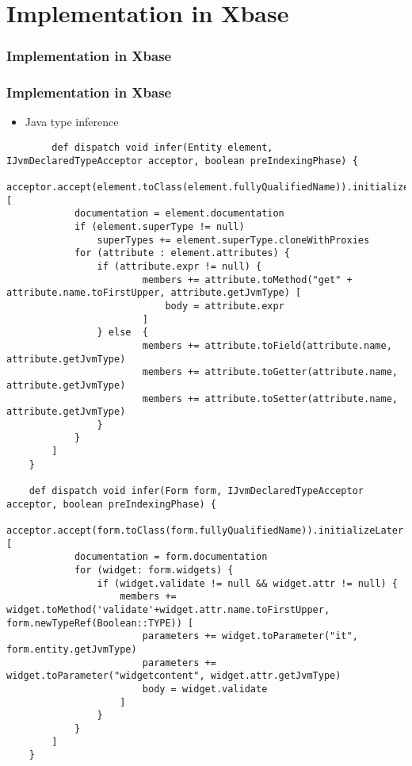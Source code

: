 \section{Implementation in Xbase}

\begin{frame}
\frametitle{Implementation in Xbase}
\tableofcontents[currentsection]
\end{frame}

\begin{frame}
\frametitle{Implementation in Xbase}
 
 \begin{itemize}
   \item Java type inference
 \end{itemize}
 
 \begin{verbatim}
    	def dispatch void infer(Entity element, IJvmDeclaredTypeAcceptor acceptor, boolean preIndexingPhase) {
   		acceptor.accept(element.toClass(element.fullyQualifiedName)).initializeLater [
			documentation = element.documentation
			if (element.superType != null)
				superTypes += element.superType.cloneWithProxies
		    for (attribute : element.attributes) {
		    	if (attribute.expr != null) {
						members += attribute.toMethod("get" + attribute.name.toFirstUpper, attribute.getJvmType) [
			        		body = attribute.expr
		        		]
		        } else  {
		            	members += attribute.toField(attribute.name, attribute.getJvmType)
			            members += attribute.toGetter(attribute.name, attribute.getJvmType)
			            members += attribute.toSetter(attribute.name, attribute.getJvmType)
		        }
		    }
   		]
   	}

 	def dispatch void infer(Form form, IJvmDeclaredTypeAcceptor acceptor, boolean preIndexingPhase) {
   		acceptor.accept(form.toClass(form.fullyQualifiedName)).initializeLater [
			documentation = form.documentation
		    for (widget: form.widgets) {
		    	if (widget.validate != null && widget.attr != null) {
		    		members += widget.toMethod('validate'+widget.attr.name.toFirstUpper, form.newTypeRef(Boolean::TYPE)) [
		    			parameters += widget.toParameter("it", form.entity.getJvmType)
		    			parameters += widget.toParameter("widgetcontent", widget.attr.getJvmType)
		    			body = widget.validate
		    		]
		    	}
		    }   		 	
   		]
   	}
\end{verbatim}
 
\end{frame}